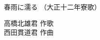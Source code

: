\documentclass[10pt,b5j]{tarticle} %
\begin{document}
\begin{minipage}[c]{0.7\hsize} %
    \begin{center}
        {\LARGE
            春雨に濡る %
        }
        {\small 
            （大正十二年寮歌） %
        }
    \end{center}
\end{minipage}
\begin{minipage}[c]{0.3\hsize} %
    \begin{flushright} %
        高橋北雄君 作歌\\西田貫道君 作曲 %
    \end{flushright}
\end{minipage}
\end{document}
